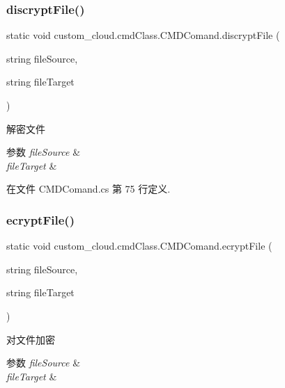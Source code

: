 \subsubsection{\texorpdfstring{discrypt\+File()}{discryptFile()}}
{\footnotesize\ttfamily static void custom\+\_\+cloud.\+cmd\+Class.\+C\+M\+D\+Comand.\+discrypt\+File (\begin{DoxyParamCaption}\item[{string}]{file\+Source,  }\item[{string}]{file\+Target }\end{DoxyParamCaption})\hspace{0.3cm}{\ttfamily [static]}}



解密文件 


\begin{DoxyParams}{参数}
{\em file\+Source} & \\
\hline
{\em file\+Target} & \\
\hline
\end{DoxyParams}


在文件 C\+M\+D\+Comand.\+cs 第 75 行定义.

\mbox{\label{classcustom__cloud_1_1cmd_class_1_1_c_m_d_comand_ace9bf104f8f3f7aa57c06bfc635cb37f}} 
\subsubsection{\texorpdfstring{ecrypt\+File()}{ecryptFile()}}
{\footnotesize\ttfamily static void custom\+\_\+cloud.\+cmd\+Class.\+C\+M\+D\+Comand.\+ecrypt\+File (\begin{DoxyParamCaption}\item[{string}]{file\+Source,  }\item[{string}]{file\+Target }\end{DoxyParamCaption})\hspace{0.3cm}{\ttfamily [static]}}



对文件加密 


\begin{DoxyParams}{参数}
{\em file\+Source} & \\
\hline
{\em file\+Target} & \\
\hline
\end{DoxyParams}


